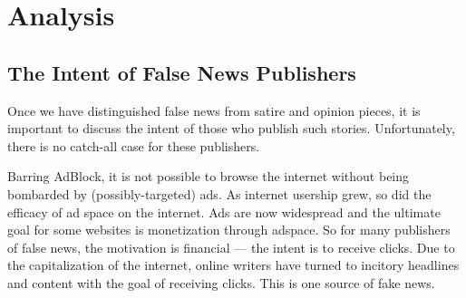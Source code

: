 
\newcommand{\tenetbox}[1]{
    \begin{framed}
    \emph{#1}
    \end{framed}
    \vspace{2mm}
}

\newcommand{\tenetsection}[1]{
    \subsubsection{#1}
}

\newcommand{\dsr}[1]{
    \subsubsubsection{Domain Specific Rule}
    \begin{framed}
    \emph{#1}
    \end{framed}
}

\section{Analysis}

\pagebreak





\subsection{The Intent of False News Publishers}

\par Once we have distinguished false news from satire and opinion pieces, it is important to discuss the intent of those who publish such stories. Unfortunately, there is no catch-all case for these publishers.

\par Barring AdBlock, it is not possible to browse the internet without being bombarded by (possibly-targeted) ads. As internet usership grew, so did the efficacy of ad space on the internet. Ads are now widespread and the ultimate goal for some websites is monetization through adspace. \cite{bbc_clickbait} So for many publishers of false news, the motivation is financial --- the intent is to receive clicks. Due to the capitalization of the internet, online writers have turned to incitory headlines and content with the goal of receiving clicks. This is one source of fake news.

